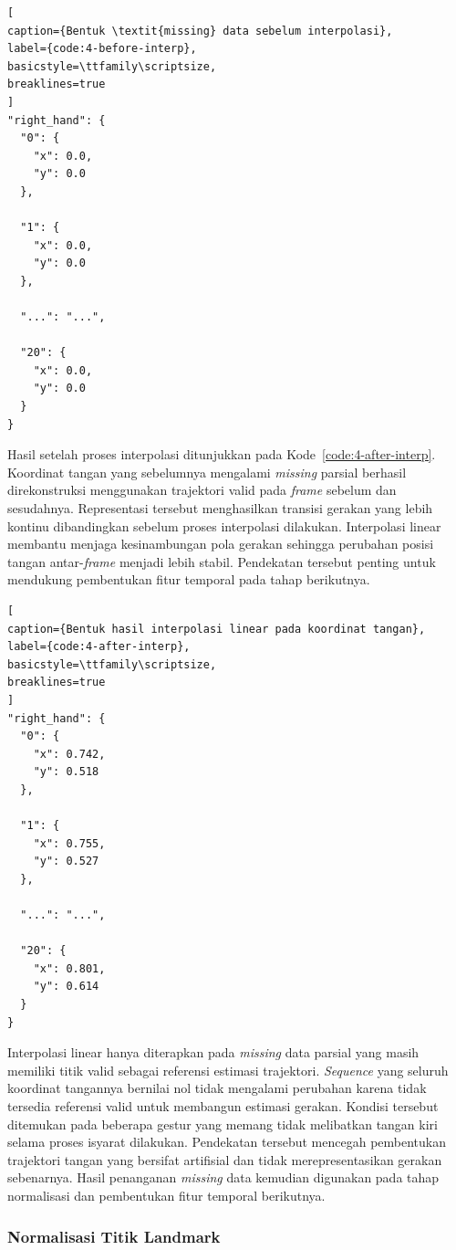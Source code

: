 \begin{lstlisting}[
caption={Bentuk \textit{missing} data sebelum interpolasi},
label={code:4-before-interp},
basicstyle=\ttfamily\scriptsize,
breaklines=true
]
"right_hand": {
  "0": {
    "x": 0.0,
    "y": 0.0
  },

  "1": {
    "x": 0.0,
    "y": 0.0
  },

  "...": "...",

  "20": {
    "x": 0.0,
    "y": 0.0
  }
}
\end{lstlisting}

Hasil setelah proses interpolasi ditunjukkan pada Kode~\ref{code:4-after-interp}. 
Koordinat tangan yang sebelumnya mengalami \textit{missing} parsial berhasil direkonstruksi menggunakan trajektori valid pada \textit{frame} sebelum dan sesudahnya. 
Representasi tersebut menghasilkan transisi gerakan yang lebih kontinu dibandingkan sebelum proses interpolasi dilakukan. 
Interpolasi linear membantu menjaga kesinambungan pola gerakan sehingga perubahan posisi tangan antar-\textit{frame} menjadi lebih stabil. 
Pendekatan tersebut penting untuk mendukung pembentukan fitur temporal pada tahap berikutnya.

\begin{lstlisting}[
caption={Bentuk hasil interpolasi linear pada koordinat tangan},
label={code:4-after-interp},
basicstyle=\ttfamily\scriptsize,
breaklines=true
]
"right_hand": {
  "0": {
    "x": 0.742,
    "y": 0.518
  },

  "1": {
    "x": 0.755,
    "y": 0.527
  },

  "...": "...",

  "20": {
    "x": 0.801,
    "y": 0.614
  }
}
\end{lstlisting}

Interpolasi linear hanya diterapkan pada \textit{missing} data parsial yang masih memiliki titik valid sebagai referensi estimasi trajektori. 
\textit{Sequence} yang seluruh koordinat tangannya bernilai nol tidak mengalami perubahan karena tidak tersedia referensi valid untuk membangun estimasi gerakan. 
Kondisi tersebut ditemukan pada beberapa gestur yang memang tidak melibatkan tangan kiri selama proses isyarat dilakukan. 
Pendekatan tersebut mencegah pembentukan trajektori tangan yang bersifat artifisial dan tidak merepresentasikan gerakan sebenarnya. 
Hasil penanganan \textit{missing} data kemudian digunakan pada tahap normalisasi dan pembentukan fitur temporal berikutnya.

\subsubsection{Normalisasi Titik Landmark}
\label{subsubsec:hasil-normalisasi}

